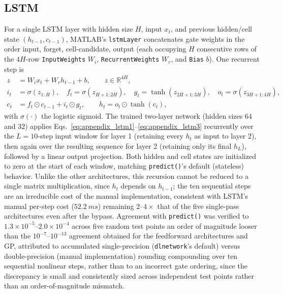 \subsection{LSTM}
\label{subsec:appendix_lstm}

For a single LSTM layer with hidden size $H$, input $x_t$, and
previous hidden/cell state $(h_{t-1}, c_{t-1})$, MATLAB's
\texttt{lstmLayer} concatenates gate weights in the order input,
forget, cell-candidate, output (each occupying $H$ consecutive rows of
the $4H$-row \texttt{InputWeights} $W_i$, \texttt{RecurrentWeights}
$W_r$, and \texttt{Bias} $b$). One recurrent step is
\begin{align}
z &= W_i x_t + W_r h_{t-1} + b, \qquad z\in\mathbb{R}^{4H}, \label{eq:appendix_lstm1}\\
i_t &= \sigma(z_{1:H}), \quad f_t = \sigma(z_{H+1:2H}), \quad
g_t = \tanh(z_{2H+1:3H}), \quad o_t = \sigma(z_{3H+1:4H}), \\
c_t &= f_t \odot c_{t-1} + i_t \odot g_t, \qquad
h_t = o_t \odot \tanh(c_t), \label{eq:appendix_lstm3}
\end{align}
with $\sigma(\cdot)$ the logistic sigmoid. The trained two-layer
network (hidden sizes $64$ and $32$) applies
Eqs.~\eqref{eq:appendix_lstm1}--\eqref{eq:appendix_lstm3} recurrently
over the $L=10$-step input window for layer 1 (retaining every $h_t$ as
input to layer 2), then again over the resulting sequence for layer 2
(retaining only its final $h_L$), followed by a linear output
projection. Both hidden and cell states are initialized to zero at the
start of each window, matching \texttt{predict()}'s default (stateless)
behavior. Unlike the other architectures, this recursion cannot be
reduced to a single matrix multiplication, since $h_t$ depends on
$h_{t-1}$; the ten sequential steps are an irreducible cost of the
manual implementation, consistent with LSTM's manual per-step cost
($\SI{52.2}{ms}$) remaining $2$--$4\times$ that of the five single-pass
architectures even after the bypass. Agreement with \texttt{predict()}
was verified to $1.3\times10^{-5}$--$2.0\times10^{-4}$ across five
random test points  an order of magnitude looser than the
$10^{-7}$--$10^{-13}$ agreement obtained for the feedforward
architectures and GP, attributed to accumulated single-precision
(\texttt{dlnetwork}'s default) versus double-precision (manual
implementation) rounding compounding over ten sequential nonlinear
steps, rather than to an incorrect gate ordering, since the
discrepancy is small and consistently sized across independent test
points rather than an order-of-magnitude mismatch.

